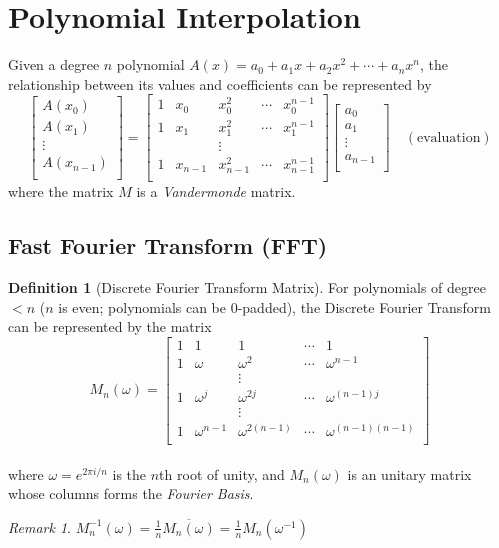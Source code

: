 \documentclass[11pt]{article}
\theoremstyle{definition}
\newtheorem{definition}{Definition}[section]
\theoremstyle{remark}
\newtheorem*{remark}{Remark}
\begin{document}
\section{Polynomial Interpolation}
Given a degree $n$ polynomial $A(x)=a_0 + a_1 x + a_2 x^2+\cdots + a_{n} x^n$, the relationship between its values and coefficients can be represented by
$$
\begin{bmatrix}
A(x_0) \\ A(x_1) \\ \vdots \\ A(x_{n-1}) \\
\end{bmatrix} = \begin{bmatrix}
1 & x_0 & x_0^2 & \cdots & x_0^{n-1} \\
1 & x_1 & x_1^2 & \cdots & x_1^{n-1} \\
&& \vdots \\
1 & x_{n-1} & x_{n-1}^2 & \cdots & x_{n-1}^{n-1} \\
\end{bmatrix} \begin{bmatrix}
a_0 \\ a_1 \\ \vdots \\ a_{n-1} \\
\end{bmatrix} \quad (\mbox{evaluation})
$$
where the matrix $M$ is a \textit{Vandermonde} matrix.

\subsection{Fast Fourier Transform (FFT)}
\begin{definition}[Discrete Fourier Transform Matrix]
For polynomials of degree $<n$ ($n$ is even; polynomials can be 0-padded), the Discrete Fourier Transform can be represented by the matrix
$$M_n (\omega) = \begin{bmatrix}
1 & 1 & 1 & \cdots & 1 \\
1 & \omega & \omega^2 & \cdots & \omega^{n-1} \\
&&\vdots \\
1 & \omega^j & \omega^{2j} & \cdots & \omega^{(n-1)j} \\
&&\vdots \\
1 & \omega^{n-1} & \omega^{2(n-1)} & \cdots & \omega^{(n-1)(n-1)} \\
\end{bmatrix}$$ \\
where $\omega = e^{2\pi i / n}$ is the $n$th root of unity, and $M_n (\omega)$ is an unitary matrix whose columns forms the \textit{Fourier Basis}.
\end{definition}
\begin{remark}
$M_n^{-1} (\omega) = \frac{1}{n} \overline{M_n (\omega)} = \frac{1}{n} M_n (\omega^{-1})$
\end{remark}
\clearpage
\end{document}
